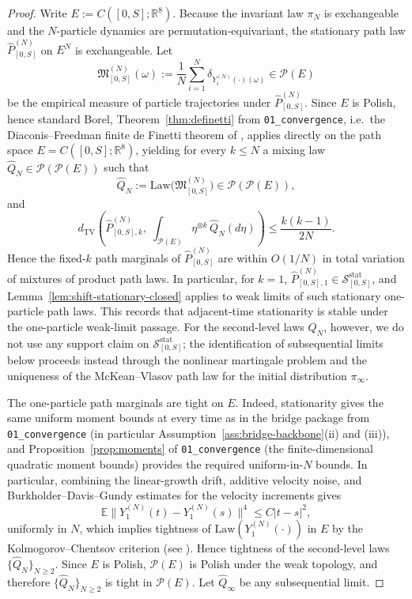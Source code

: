 \documentclass[11pt]{article}
\theoremstyle{definition}
\theoremstyle{remark}
\newcommand{\R}{\mathbb R}
\newcommand{\Law}{\mathrm{Law}}
\newcommand{\E}{\mathbb E}
\newcommand{\TV}{\mathrm{TV}}
\newcommand{\mcP}{\mathcal P}
\begin{document}
\begin{proof}
Write \(E:=C([0,S];\R^8)\).
Because the invariant law \(\pi_N\) is exchangeable and the \(N\)-particle
dynamics are permutation-equivariant, the stationary path law
\(\widehat P_{[0,S]}^{(N)}\) on \(E^N\) is exchangeable.
Let
\[
\mathfrak M_{[0,S]}^{(N)}(\omega)
:=
\frac1N\sum_{i=1}^N\delta_{Y_i^{(N)}(\cdot)(\omega)}
\in\mcP(E)
\]
be the empirical measure of particle trajectories under
\(\widehat P_{[0,S]}^{(N)}\). Since \(E\) is Polish, hence standard Borel,
Theorem~\ref{thm:definetti} from \texttt{01\_convergence}, i.e.\ the
Diaconis--Freedman finite de Finetti theorem of
\cite{diaconis1980finite},
applies directly on the path space \(E=C([0,S];\R^8)\), yielding for every
\(k\le N\) a mixing law
\(\widehat Q_N\in\mcP(\mcP(E))\) such that
\[
\widehat Q_N:=\Law\!\bigl(\mathfrak M_{[0,S]}^{(N)}\bigr)
\in\mcP(\mcP(E)),
\]
and
\[
d_{\TV}\!\left(
\widehat P^{(N)}_{[0,S],k},\;
\int_{\mcP(E)}\eta^{\otimes k}\,\widehat Q_N(d\eta)
\right)
\le
\frac{k(k-1)}{2N}.
\]
Hence the fixed-\(k\) path marginals of \(\widehat P_{[0,S]}^{(N)}\) are within
\(O(1/N)\) in total variation of mixtures of product path laws.
In particular, for \(k=1\), \(\widehat P^{(N)}_{[0,S],1}\in\mathcal S^{\mathrm{stat}}_{[0,S]}\),
and Lemma~\ref{lem:shift-stationary-closed} applies to weak limits of such
stationary one-particle path laws. This records that adjacent-time
stationarity is stable under the one-particle weak-limit passage. For the
second-level laws \(\widehat Q_N\), however, we do not use any support claim on
\(\mathcal S^{\mathrm{stat}}_{[0,S]}\); the identification of subsequential
limits below proceeds instead through the nonlinear martingale problem and the
uniqueness of the McKean--Vlasov path law for the initial distribution
\(\pi_\infty\).

The one-particle path marginals are tight on \(E\).
Indeed, stationarity gives the same uniform moment bounds at every time as in the
bridge package from \texttt{01\_convergence} (in particular
Assumption~\ref{ass:bridge-backbone}(ii) and (iii)), and
Proposition~\ref{prop:moments} of
\texttt{01\_convergence} (the finite-dimensional quadratic moment bounds) provides
the required uniform-in-\(N\) bounds.
In particular, combining the linear-growth drift, additive velocity noise, and
Burkholder--Davis--Gundy estimates for the velocity increments gives
\[
\E\|Y_1^{(N)}(t)-Y_1^{(N)}(s)\|^4
\le C|t-s|^2,
\]
uniformly in \(N\), which implies tightness of
\(\Law(Y_1^{(N)}(\cdot))\) in \(E\) by the Kolmogorov--Chentsov criterion
(see \cite[Chapter~2]{billingsley1999convergence}). Hence tightness of the second-level laws
\(\{\widehat Q_N\}_{N\ge2}\). Since \(E\) is Polish, \(\mcP(E)\) is Polish under
the weak topology, and therefore \(\{\widehat Q_N\}_{N\ge2}\) is tight in
\(\mcP(E)\).
Let \(\widehat Q_\infty\) be any subsequential limit.


\end{proof}
\end{document}
